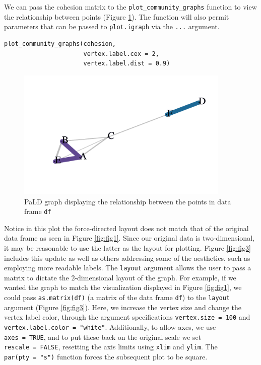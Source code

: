 We can pass the cohesion matrix to the \texttt{plot\_community\_graphs} function to view the relationship between points (Figure \ref{fig:fig2}). The function will also permit parameters that can be passed to \texttt{plot.igraph} via the \texttt{...} argument.

\begin{verbatim}
plot_community_graphs(cohesion,
                      vertex.label.cex = 2,
                      vertex.label.dist = 0.9)
\end{verbatim}

\begin{figure}[H]
\centering\includegraphics[width=4in,trim=0in .4in 0in .4in,clip]{dagostino-mcgowan_files/figure-latex/fig2-1.pdf}
\caption{\label{fig:fig2}PaLD graph displaying the relationship between the points in data frame \texttt{df}}
\end{figure}

Notice in this plot the force-directed layout does not match that of the original data frame as seen in Figure \ref{fig:fig1}. Since our original data is two-dimensional, it may be reasonable to use the latter as the layout for plotting. Figure \ref{fig:fig3} includes this update as well as others addressing some of the aesthetics, such as employing more readable labels. The \texttt{layout} argument allows the user to pass a matrix to dictate the 2-dimensional layout of the graph. For example, if we wanted the graph to match the visualization displayed in Figure \ref{fig:fig1}, we could pass \texttt{as.matrix(df)} (a matrix of the data frame \texttt{df}) to the \texttt{layout} argument (Figure \ref{fig:fig3}). Here, we increase the vertex size and change the vertex label color, through the argument specifications \texttt{vertex.size\ =\ 100} and \texttt{vertex.label.color\ =\ "white"}. Additionally, to allow axes, we use \texttt{axes\ =\ TRUE}, and to put these back on the original scale we set \texttt{rescale\ =\ FALSE}, resetting the axis limits using \texttt{xlim} and \texttt{ylim}. The \texttt{par(pty\ =\ "s")} function forces the subsequent plot to be square.

